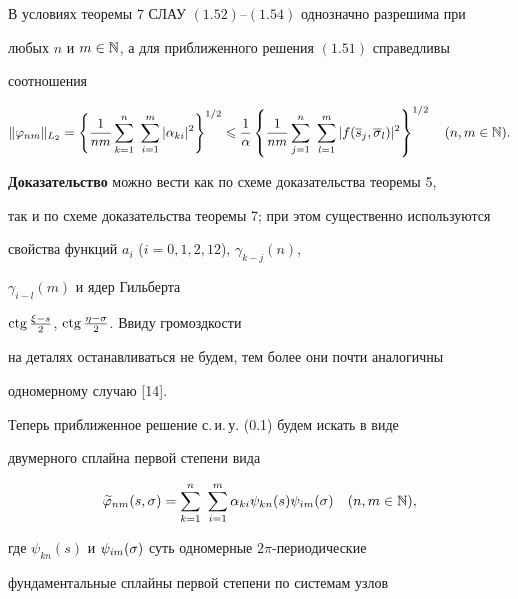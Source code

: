 \begin{thm}


В условиях теоремы $7$ СЛАУ $(1.52)$--$(1.54)$ однозначно разрешима при 


любых $n$ и $m\in \Bbb N$, а для приближенного решения $(1.51)$ справедливы 


соотношения


$$


\|\vp_{nm}\|_{L_2} = \left\{


\frac{1}{nm}\sum_{k=1}^n\ \sum_{i=1}^m|\alpha_{ki}|^2


\right\}^{1/2}\lea \frac{1}{\alpha}\left\{


\frac{1}{nm}\sum_{j=1}^n\ \sum_{l=1}^m |f(\ol{s}_j,\ol{\si}_l)|^2


\right\}^{1/2} \quad (n,m\in \N).


$$


\end{thm}





{\bf Доказательство} можно вести как по схеме доказательства теоремы 5, 


так и по схеме доказательства теоремы 7; при этом существенно используются 


свойства функций $a_i$ ($i=0,1,2,12$), $\gamma_{k-j}(n)$,


$\gamma_{i-l}(m)$ и ядер Гильберта


$\operatorname{ctg}\frac{\xi-s}{2}$, $\operatorname{ctg}\frac{\eta-\sigma}{2}$. Ввиду громоздкости 


на деталях останавливаться не будем, тем более они почти аналогичны 


одномерному случаю [14]. 





Теперь приближенное решение с.\,и.\,у. (0.1) будем искать в виде 


двумерного сплайна первой степени вида


\begin{equation}


\widetilde{\vp}_{nm}(s,\si) = \sum_{k=1}^n\ \sum_{i=1}^m


\alpha_{ki}\psi_{kn}(s) \psi_{im}(\si)\quad (n,m\in \N),


\end{equation}


где $\psi_{kn}(s)$ и $\psi_{im}(\sigma)$ суть одномерные $2\pi$-периодические 


фундаментальные сплайны первой степени по системам узлов  


